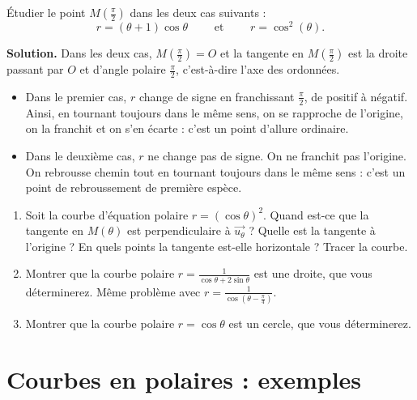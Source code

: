 \documentclass[class=report,crop=false]{standalone}
\begin{document}
\begin{exemple}
Étudier le point $M(\frac{\pi}{2})$ dans les deux cas suivants :
$$r=(\theta+1)\cos \theta \qquad \text{ et } \qquad r=\cos^2(\theta).$$

\medskip
\textbf{Solution.}
Dans les deux cas, $M(\frac{\pi}{2})=O$ et
la tangente en $M(\frac{\pi}{2})$ est la droite passant par $O$ et
d'angle polaire $\frac{\pi}{2}$, c'est-à-dire l'axe des ordonnées.

\begin{itemize}
  \item Dans le premier cas, $r$ change de signe en franchissant
$\frac{\pi}{2}$, de positif à négatif. Ainsi, en tournant toujours dans le même
sens, on se rapproche de l'origine, on la franchit et on
s'en écarte : c'est un point d'allure ordinaire.

  \item Dans le deuxième cas, $r$ ne change pas de signe.
On ne franchit pas l'origine. On rebrousse chemin tout en tournant
toujours dans le même sens : c'est un point de rebroussement de première espèce.
\end{itemize}

\end{exemple}


\begin{miniexercices}
\sauteligne
\begin{enumerate}
  \item Soit la courbe d'équation polaire $r = (\cos \theta)^2$.
  Quand est-ce que la tangente en $M(\theta)$ est perpendiculaire à $\overrightarrow{u_\theta}$ ?
  Quelle est la tangente à l'origine ? En quels points la tangente est-elle
  horizontale ? Tracer la courbe.

  \item Montrer que la courbe polaire $r=\frac{1}{\cos \theta+2\sin\theta}$
  est une droite, que vous déterminerez. Même problème avec
  $r = \frac{1}{\cos \left( \theta-\frac\pi4 \right)}$.

  \item Montrer que la courbe polaire $r = \cos \theta$
  est un cercle, que vous déterminerez.
\end{enumerate}
\end{miniexercices}



\section{Courbes en polaires : exemples}
\end{document}
